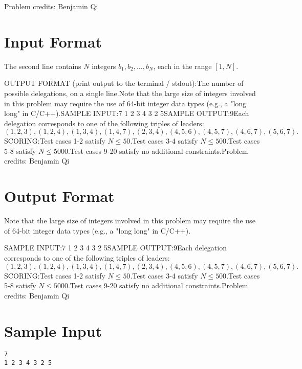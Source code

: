 \documentclass[12pt]{article}
\begin{document}
Problem credits: Benjamin Qi



\section*{Input Format}
The second line contains $N$ integers $b_1,b_2,\ldots,b_N$, each in the range
$[1,N]$.

OUTPUT FORMAT (print output to the terminal / stdout):The number of possible delegations, on a single line.Note that the large size of integers involved in this problem may require the
use of 64-bit integer data types (e.g., a "long long" in C/C++).SAMPLE INPUT:7
1 2 3 4 3 2 5SAMPLE OUTPUT:9Each delegation corresponds to one of the following triples of leaders:$$(1,2,3),(1,2,4),(1,3,4),(1,4,7),(2,3,4),(4,5,6),(4,5,7),(4,6,7),(5,6,7).$$SCORING:Test cases 1-2 satisfy $N\le 50$.Test cases 3-4 satisfy $N\le 500$.Test cases 5-8 satisfy $N\le 5000$.Test cases 9-20 satisfy no additional constraints.Problem credits: Benjamin Qi

\section*{Output Format}
Note that the large size of integers involved in this problem may require the
use of 64-bit integer data types (e.g., a "long long" in C/C++).

SAMPLE INPUT:7
1 2 3 4 3 2 5SAMPLE OUTPUT:9Each delegation corresponds to one of the following triples of leaders:$$(1,2,3),(1,2,4),(1,3,4),(1,4,7),(2,3,4),(4,5,6),(4,5,7),(4,6,7),(5,6,7).$$SCORING:Test cases 1-2 satisfy $N\le 50$.Test cases 3-4 satisfy $N\le 500$.Test cases 5-8 satisfy $N\le 5000$.Test cases 9-20 satisfy no additional constraints.Problem credits: Benjamin Qi

\section*{Sample Input}
\begin{verbatim}
7
1 2 3 4 3 2 5
\end{verbatim}
\end{document}

